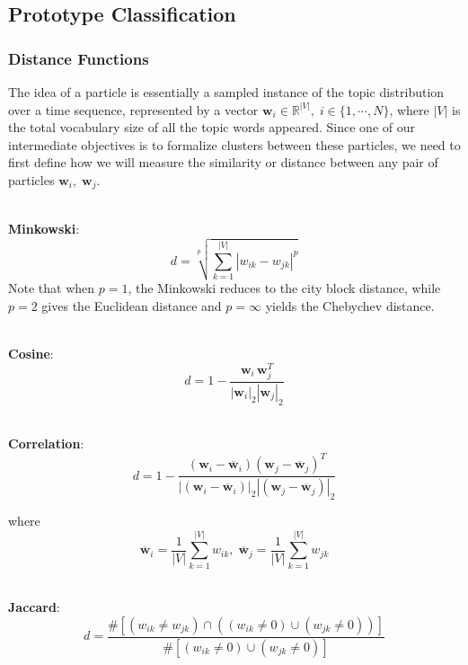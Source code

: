 \documentclass[conference]{IEEEtran}
\begin{document}
\subsection{Prototype Classification}


\subsubsection{Distance Functions}
The idea of a particle is essentially a sampled instance of the topic distribution over a time sequence, represented by a vector $\mathbf{w}_i\in \mathbb{R}^{|V|},\; i \in \{1,\cdots,N\}$, where $|V|$ is the total vocabulary size of all the topic words appeared. Since one of our intermediate objectives is to formalize clusters between these particles, we need to first define how we will measure the similarity or distance between any pair of particles $\mathbf{w}_i,\; \mathbf{w}_j$. 

\-\\
\textbf{Minkowski}: 
\begin{equation*}
	d = \sqrt[p]{\sum_{k=1}^{|V|}|w_{ik} - w_{jk}|^p}
\end{equation*}
 Note that when $p=1$, the Minkowski reduces to the city block distance, while $p=2$ gives the Euclidean distance and $p=\infty$ yields the Chebychev distance.

\-\\
\textbf{Cosine}: 
\begin{equation*}
d = 1 - \frac{\mathbf{w}_i\,\mathbf{w}_j^T}{|\mathbf{w}_i|_2|\mathbf{w}_j|_2}
\end{equation*}

\-\\
\textbf{Correlation}: 
\begin{equation*}
d = 1 - \frac{(\mathbf{w}_i - \overline{\mathbf{w}}_i)(\mathbf{w}_j - \overline{\mathbf{w}}_j)^T}{|(\mathbf{w}_i - \overline{\mathbf{w}}_i)|_2|(\mathbf{w}_j - \overline{\mathbf{w}}_j)|_2}
\end{equation*}

where 
\begin{equation*}
	\overline{\mathbf{w}}_i = \frac{1}{|V|}\sum_{k=1}^{|V|}w_{ik},\;
	\overline{\mathbf{w}}_j = \frac{1}{|V|}\sum_{k=1}^{|V|}w_{jk}
\end{equation*}

\-\\
\textbf{Jaccard}: 
\begin{equation*}
	d = \frac{\# \left[(w_{ik} \neq w_{jk})\cap((w_{ik} \neq 0)\cup(w_{jk} \neq 0))\right]}{\#\left[(w_{ik} \neq 0)\cup(w_{jk} \neq 0)\right]}
\end{equation*}
\end{document}
